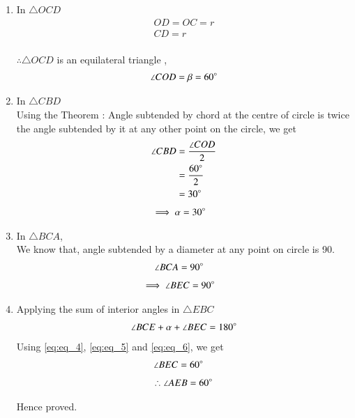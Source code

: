 \renewcommand{\theequation}{\theenumi}
\begin{enumerate}[label=\thesection.\arabic*.,ref=\thesection.\theenumi]

\item  In $\triangle OCD$ 
		\begin{align}
		OD = OC = r  \\
    	CD = r \\
		\end{align}
  
   
    $\therefore \triangle OCD $ is an equilateral triangle , 
    \begin{align}
    \angle COD = \beta = 60\degree
    \end{align}
  
\item  In $\triangle CBD$ \\
Using the Theorem : Angle subtended by chord at the centre of circle is twice the angle subtended by it at any other point on the circle, we get
\begin{align}
\angle CBD &= \frac{\angle COD}{2} \\ 
 &= \frac{60\degree}{2} \\
 &= 30\degree
\end{align}
\begin{align} 
 \implies \alpha &= 30\degree
 \label{eq:eq_4}
\end{align}
    
\item In $\triangle BCA$, \\
We know that, angle subtended by a diameter at any point on circle is 90\degree.
\begin{align}
\angle BCA &= 90\degree 
\end{align}
\begin{align}
\implies \angle BEC &= 90\degree
\label{eq:eq_5}
\end{align}
    
\item Applying the sum of interior angles in $\triangle EBC$ 
\begin{align}
\angle BCE + \alpha + \angle BEC = 180\degree
\label{eq:eq_6}
\end{align}
Using \eqref{eq:eq_4}, \eqref{eq:eq_5} and \eqref{eq:eq_6}, we get
\begin{align}
\angle BEC &= 60\degree
\end{align}
\begin{align}
\therefore \angle AEB = 60\degree 
\end{align}
    
Hence proved.
    
\end{enumerate}   
       